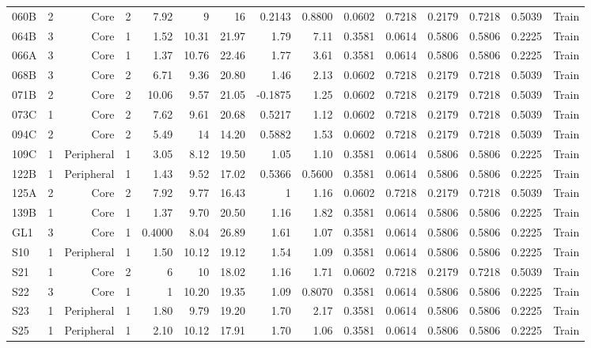 {\begin{longtable}{lrrrrrrrrrrrrrr}
  060B & 2 & Core & 2 & 7.92 & 9 & 16 & 0.2143 & 0.8800 & 0.0602 & 0.7218 & 0.2179 & 0.7218 & 0.5039 & Train \\
  064B & 3 & Core & 1 & 1.52 & 10.31 & 21.97 & 1.79 & 7.11 & 0.3581 & 0.0614 & 0.5806 & 0.5806 & 0.2225 & Train \\
  066A & 3 & Core & 1 & 1.37 & 10.76 & 22.46 & 1.77 & 3.61 & 0.3581 & 0.0614 & 0.5806 & 0.5806 & 0.2225 & Train \\
  068B & 3 & Core & 2 & 6.71 & 9.36 & 20.80 & 1.46 & 2.13 & 0.0602 & 0.7218 & 0.2179 & 0.7218 & 0.5039 & Train \\
  071B & 2 & Core & 2 & 10.06 & 9.57 & 21.05 & -0.1875 & 1.25 & 0.0602 & 0.7218 & 0.2179 & 0.7218 & 0.5039 & Train \\
  073C & 1 & Core & 2 & 7.62 & 9.61 & 20.68 & 0.5217 & 1.12 & 0.0602 & 0.7218 & 0.2179 & 0.7218 & 0.5039 & Train \\
  094C & 2 & Core & 2 & 5.49 & 14 & 14.20 & 0.5882 & 1.53 & 0.0602 & 0.7218 & 0.2179 & 0.7218 & 0.5039 & Train \\
  109C & 1 & Peripheral & 1 & 3.05 & 8.12 & 19.50 & 1.05 & 1.10 & 0.3581 & 0.0614 & 0.5806 & 0.5806 & 0.2225 & Train \\
  122B & 1 & Peripheral & 1 & 1.43 & 9.52 & 17.02 & 0.5366 & 0.5600 & 0.3581 & 0.0614 & 0.5806 & 0.5806 & 0.2225 & Train \\
  125A & 2 & Core & 2 & 7.92 & 9.77 & 16.43 & 1 & 1.16 & 0.0602 & 0.7218 & 0.2179 & 0.7218 & 0.5039 & Train \\
  139B & 1 & Core & 1 & 1.37 & 9.70 & 20.50 & 1.16 & 1.82 & 0.3581 & 0.0614 & 0.5806 & 0.5806 & 0.2225 & Train \\
  GL1 & 3 & Core & 1 & 0.4000 & 8.04 & 26.89 & 1.61 & 1.07 & 0.3581 & 0.0614 & 0.5806 & 0.5806 & 0.2225 & Train \\
  S10 & 1 & Peripheral & 1 & 1.50 & 10.12 & 19.12 & 1.54 & 1.09 & 0.3581 & 0.0614 & 0.5806 & 0.5806 & 0.2225 & Train \\
  S21 & 1 & Core & 2 & 6 & 10 & 18.02 & 1.16 & 1.71 & 0.0602 & 0.7218 & 0.2179 & 0.7218 & 0.5039 & Train \\
  S22 & 3 & Core & 1 & 1 & 10.20 & 19.35 & 1.09 & 0.8070 & 0.3581 & 0.0614 & 0.5806 & 0.5806 & 0.2225 & Train \\
  S23 & 1 & Peripheral & 1 & 1.80 & 9.79 & 19.20 & 1.70 & 2.17 & 0.3581 & 0.0614 & 0.5806 & 0.5806 & 0.2225 & Train \\
  S25 & 1 & Peripheral & 1 & 2.10 & 10.12 & 17.91 & 1.70 & 1.06 & 0.3581 & 0.0614 & 0.5806 & 0.5806 & 0.2225 & Train \\

\end{longtable}}
